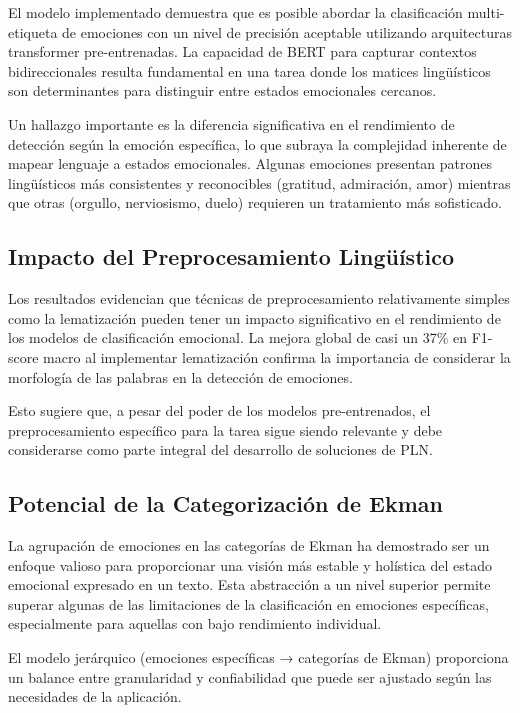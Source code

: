 \documentclass[12pt,a4paper]{report}
\begin{document}
El modelo implementado demuestra que es posible abordar la clasificación multi-etiqueta de emociones con un nivel de precisión aceptable utilizando arquitecturas transformer pre-entrenadas. La capacidad de BERT para capturar contextos bidireccionales resulta fundamental en una tarea donde los matices lingüísticos son determinantes para distinguir entre estados emocionales cercanos.

Un hallazgo importante es la diferencia significativa en el rendimiento de detección según la emoción específica, lo que subraya la complejidad inherente de mapear lenguaje a estados emocionales. Algunas emociones presentan patrones lingüísticos más consistentes y reconocibles (gratitud, admiración, amor) mientras que otras (orgullo, nerviosismo, duelo) requieren un tratamiento más sofisticado.

\subsection{Impacto del Preprocesamiento Lingüístico}

Los resultados evidencian que técnicas de preprocesamiento relativamente simples como la lematización pueden tener un impacto significativo en el rendimiento de los modelos de clasificación emocional. La mejora global de casi un 37\% en F1-score macro al implementar lematización confirma la importancia de considerar la morfología de las palabras en la detección de emociones.

Esto sugiere que, a pesar del poder de los modelos pre-entrenados, el preprocesamiento específico para la tarea sigue siendo relevante y debe considerarse como parte integral del desarrollo de soluciones de PLN.

\subsection{Potencial de la Categorización de Ekman}

La agrupación de emociones en las categorías de Ekman ha demostrado ser un enfoque valioso para proporcionar una visión más estable y holística del estado emocional expresado en un texto. Esta abstracción a un nivel superior permite superar algunas de las limitaciones de la clasificación en emociones específicas, especialmente para aquellas con bajo rendimiento individual.

El modelo jerárquico (emociones específicas → categorías de Ekman) proporciona un balance entre granularidad y confiabilidad que puede ser ajustado según las necesidades de la aplicación.
\end{document}
